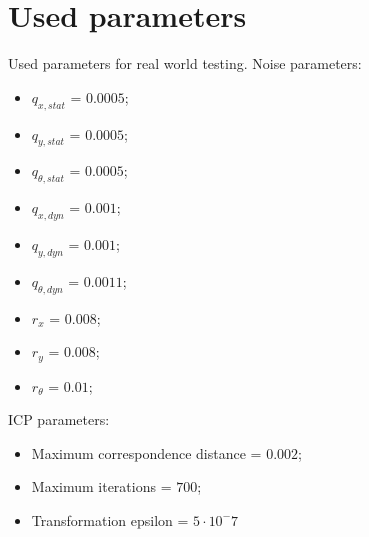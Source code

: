 \appendices
\label{sec:Appendices}
\section{Used parameters}
\label{sec:parameters}
Used parameters for real world testing.
Noise parameters:
\begin{itemize}
\item $q_{x,stat}$ = $0.0005$;
\item $q_{y,stat}$ = $0.0005$;
\item $q_{\theta,stat}$ = $0.0005$;
\item $q_{x,dyn}$ = $0.001$;
\item $q_{y,dyn}$ = $0.001$;
\item $q_{\theta,dyn}$ = $0.0011$;
\item $r_{x}$ = $0.008$;
\item $r_{y}$ = $0.008$;
\item $r_{\theta}$ = $0.01$;
\end{itemize}
ICP parameters:
\begin{itemize}
\item Maximum correspondence distance = $0.002$;
\item Maximum iterations = $700$;
\item Transformation epsilon = $5 \cdot 10^-7$
\end{itemize}


